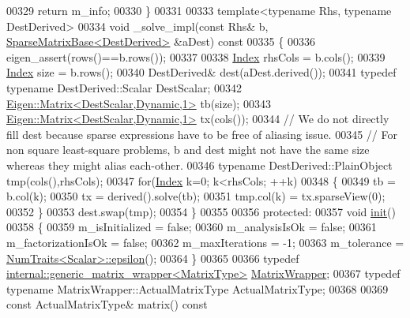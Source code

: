 \begin{DoxyCode}
00329     \textcolor{keywordflow}{return} m\_info;
00330   \}
00331   
00333   \textcolor{keyword}{template}<\textcolor{keyword}{typename} Rhs, \textcolor{keyword}{typename} DestDerived>
00334   \textcolor{keywordtype}{void} \_solve\_impl(\textcolor{keyword}{const} Rhs& b, \hyperlink{group___sparse_core___module_class_eigen_1_1_sparse_matrix_base}{SparseMatrixBase<DestDerived>} &aDest)\textcolor{keyword}{ const}
00335 \textcolor{keyword}{  }\{
00336     eigen\_assert(rows()==b.rows());
00337     
00338     \hyperlink{namespace_eigen_a62e77e0933482dafde8fe197d9a2cfde}{Index} rhsCols = b.cols();
00339     \hyperlink{namespace_eigen_a62e77e0933482dafde8fe197d9a2cfde}{Index} size = b.rows();
00340     DestDerived& dest(aDest.derived());
00341     \textcolor{keyword}{typedef} \textcolor{keyword}{typename} DestDerived::Scalar DestScalar;
00342     \hyperlink{group___core___module_class_eigen_1_1_matrix}{Eigen::Matrix<DestScalar,Dynamic,1>} tb(size);
00343     \hyperlink{group___core___module_class_eigen_1_1_matrix}{Eigen::Matrix<DestScalar,Dynamic,1>} tx(cols());
00344     \textcolor{comment}{// We do not directly fill dest because sparse expressions have to be free of aliasing issue.}
00345     \textcolor{comment}{// For non square least-square problems, b and dest might not have the same size whereas they might
       alias each-other.}
00346     \textcolor{keyword}{typename} DestDerived::PlainObject tmp(cols(),rhsCols);
00347     \textcolor{keywordflow}{for}(\hyperlink{namespace_eigen_a62e77e0933482dafde8fe197d9a2cfde}{Index} k=0; k<rhsCols; ++k)
00348     \{
00349       tb = b.col(k);
00350       tx = derived().solve(tb);
00351       tmp.col(k) = tx.sparseView(0);
00352     \}
00353     dest.swap(tmp);
00354   \}
00355 
00356 \textcolor{keyword}{protected}:
00357   \textcolor{keywordtype}{void} \hyperlink{structinit}{init}()
00358   \{
00359     m\_isInitialized = \textcolor{keyword}{false};
00360     m\_analysisIsOk = \textcolor{keyword}{false};
00361     m\_factorizationIsOk = \textcolor{keyword}{false};
00362     m\_maxIterations = -1;
00363     m\_tolerance = \hyperlink{group___core___module_struct_eigen_1_1_num_traits}{NumTraits<Scalar>::epsilon}();
00364   \}
00365 
00366   \textcolor{keyword}{typedef} \hyperlink{class_eigen_1_1internal_1_1generic__matrix__wrapper}{internal::generic\_matrix\_wrapper<MatrixType>} 
      \hyperlink{class_eigen_1_1internal_1_1generic__matrix__wrapper}{MatrixWrapper};
00367   \textcolor{keyword}{typedef} \textcolor{keyword}{typename} MatrixWrapper::ActualMatrixType ActualMatrixType;
00368 
00369   \textcolor{keyword}{const} ActualMatrixType& matrix()\textcolor{keyword}{ const}

\end{DoxyCode}
